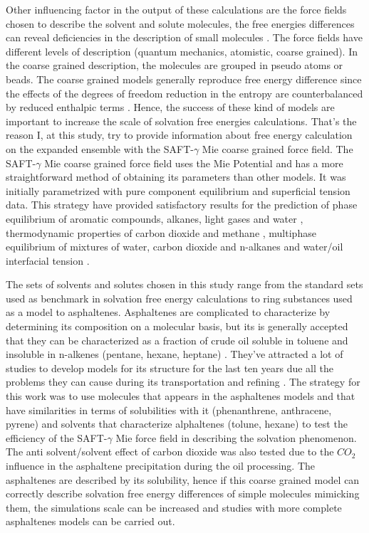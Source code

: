 Other influencing factor in the output of these calculations are the force fields chosen to describe the solvent and solute molecules, the free energies differences  can reveal deficiencies in the description of small molecules \cite{mobley2007,shirts2013}. The force fields have different levels of description (quantum mechanics, atomistic, coarse grained). In the coarse grained description, the molecules are grouped in pseudo atoms or beads. The coarse grained models generally reproduce free energy difference since the effects of the degrees of freedom reduction  in the entropy are counterbalanced by reduced enthalpic terms \cite{kmiecik2016}. Hence, the success of these kind of models are important to  increase the scale of solvation free energies calculations. That's the reason I, at this study, try to provide information about free energy calculation on the expanded ensemble with the SAFT-$\gamma$ Mie coarse grained force field. The SAFT-$\gamma$ Mie coarse grained force field uses the Mie Potential \cite{MIE} and has a more straightforward method of obtaining its parameters than other models. It was initially parametrized with pure component equilibrium and superficial tension data. This strategy have provided satisfactory results for the prediction of phase equilibrium of aromatic compounds, alkanes, light gases and water \cite{herdes2015,muller2017,lobanova2015} , thermodynamic properties of carbon dioxide and methane \cite{cassiano1}, multiphase equilibrium of mixtures of water, carbon dioxide and n-alkanes \cite{lobanova2016} and water/oil interfacial tension \cite{herdes2017}.  

The sets of solvents and solutes chosen in this study range from the standard sets used as benchmark in solvation free energy calculations to ring substances used as a model to asphaltenes. Asphaltenes are complicated to characterize by determining its composition on a molecular basis, but its is generally accepted that they can be characterized as a fraction of crude oil soluble in toluene and insoluble in n-alkenes (pentane, hexane, heptane) \cite{SJOBLOM2003399}. They've attracted a  lot of studies to develop models for its structure for the last ten years  due all the problems they can cause during its transportation and refining \cite{SJOBLOM20151}. The strategy for this work was to use molecules that appears in the asphaltenes models and that have similarities in terms of solubilities with it (phenanthrene, anthracene, pyrene) and solvents that characterize alphaltenes (tolune, hexane) to test the efficiency of the SAFT-$\gamma$ Mie force field in describing the solvation phenomenon. The anti solvent/solvent effect of carbon dioxide was also tested due to the $CO_{2}$ influence in the asphaltene precipitation during the oil processing. The asphaltenes are described by its solubility, hence if this coarse grained model can correctly describe solvation free energy differences of simple molecules mimicking them, the simulations scale can be increased and studies with more complete asphaltenes models can be carried out.

